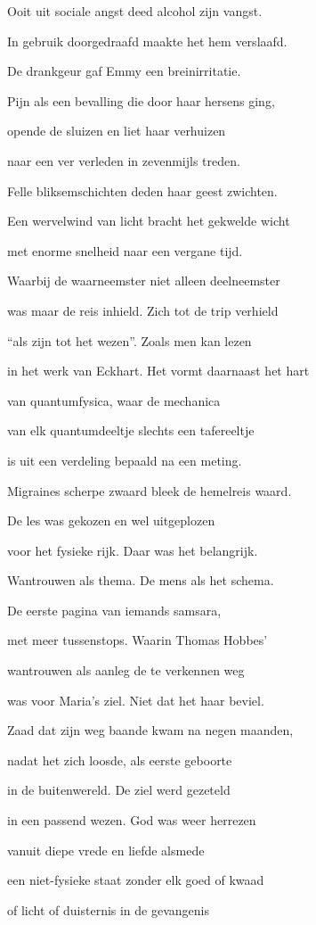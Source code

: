 Ooit uit sociale angst
deed alcohol zijn vangst.

In gebruik doorgedraafd
maakte het hem verslaafd.

De drankgeur gaf Emmy
een breinirritatie.

Pijn als een bevalling
die door haar hersens ging,

opende de sluizen
en liet haar verhuizen

naar een ver verleden
in zevenmijls treden.

Felle bliksemschichten
deden haar geest zwichten.

Een wervelwind van licht
bracht het gekwelde wicht

met enorme snelheid
naar een vergane tijd.

Waarbij de waarneemster
niet alleen deelneemster

was maar de reis inhield.
Zich tot de trip verhield

“als zijn tot het wezen”.
Zoals men kan lezen

in het werk van Eckhart.
Het vormt daarnaast het hart

van quantumfysica,
waar de mechanica

van elk quantumdeeltje
slechts een tafereeltje

is uit een verdeling
bepaald na een meting.

Migraines scherpe zwaard
bleek de hemelreis waard.

De les was gekozen
en wel uitgeplozen

voor het fysieke rijk.
Daar was het belangrijk.

Wantrouwen als thema.
De mens als het schema.

De eerste pagina
van iemands samsara,

met meer tussenstops.
Waarin Thomas Hobbes’

wantrouwen als aanleg
de te verkennen weg

was voor Maria’s ziel.
Niet dat het haar beviel.

Zaad dat zijn weg baande
kwam na negen maanden,

nadat het zich loosde,
als eerste geboorte

in de buitenwereld.
De ziel werd gezeteld

in een passend wezen.
God was weer herrezen

vanuit diepe vrede
en liefde alsmede

een niet-fysieke staat
zonder elk goed of kwaad

of licht of duisternis
in de gevangenis

